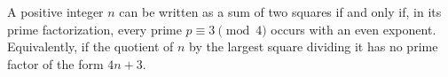 A positive integer $n$ can be written as a sum of two squares if and only if, in its prime factorization, every prime $p \equiv 3 \pmod{4}$ occurs with an even exponent. Equivalently, if the quotient of $n$ by the largest square dividing it has no prime factor of the form $4n + 3$.
